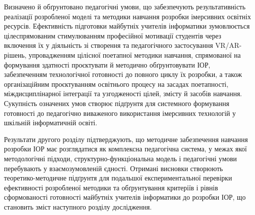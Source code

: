 Визначено й обґрунтовано педагогічні умови, що забезпечують результативність реалізації розробленої моделі та методики навчання розробки імерсивних освітніх ресурсів. Ефективність підготовки майбутніх учителів інформатики зумовлюється цілеспрямованим стимулюванням професійної мотивації студентів через включення їх у діяльність зі створення та педагогічного застосування VR/AR-рішень, упровадженням цілісної поетапної методики навчання, спрямованої на формування здатності проєктувати й методично обґрунтовувати ІОР, забезпеченням технологічної готовності до повного циклу їх розробки, а також організаційним проєктуванням освітнього процесу на засадах поетапності, міждисциплінарної інтеграції та узгодженості цілей, змісту й засобів навчання. Сукупність означених умов створює підґрунтя для системного формування готовності до педагогічно виваженого використання імерсивних технологій у шкільній інформатичній освіті.

Результати другого розділу підтверджують, що методичне забезпечення навчання розробки ІОР має розглядатися як комплексна педагогічна система, у межах якої методологічні підходи, структурно-функціональна модель і педагогічні умови перебувають у взаємозумовленій єдності. Отримані висновки створюють теоретико-методичне підґрунтя для подальшої експериментальної перевірки ефективності розробленої методики та обґрунтування критеріїв і рівнів сформованості готовності майбутніх учителів інформатики до розробки ІОР, що становить зміст наступного розділу дослідження.
